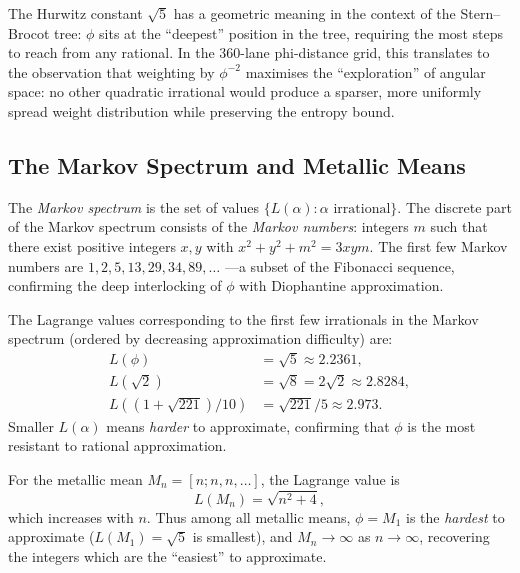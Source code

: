 \begin{remark}\label{rem:geom-interp}
The Hurwitz constant $\sqrt{5}$ has a geometric
meaning in the context of the Stern--Brocot tree:
$\phi$ sits at the ``deepest'' position in the
tree, requiring the most steps to reach from
any rational.  In the 360-lane phi-distance grid,
this translates to the observation that weighting
by $\phi^{-2}$ maximises the ``exploration'' of
angular space: no other quadratic irrational would
produce a sparser, more uniformly spread weight
distribution while preserving the entropy bound.
\end{remark}

\subsection{The Markov Spectrum and Metallic Means}
\label{subsec:markov-spectrum}

The \emph{Markov spectrum} is the set of values
$\{L(\alpha) : \alpha \text{ irrational}\}$.
The discrete part of the Markov spectrum consists
of the \emph{Markov numbers}: integers $m$ such
that there exist positive integers $x, y$ with
$x^2 + y^2 + m^2 = 3xym$.  The first few Markov
numbers are $1, 2, 5, 13, 29, 34, 89, \ldots$
---a subset of the Fibonacci sequence, confirming
the deep interlocking of $\phi$ with Diophantine
approximation.

The Lagrange values corresponding to the first
few irrationals in the Markov spectrum (ordered by
decreasing approximation difficulty) are:
\begin{align*}
  L(\phi) &= \sqrt{5} \approx 2.2361, \\
  L(\sqrt{2}) &= \sqrt{8} = 2\sqrt{2} \approx 2.8284, \\
  L((1+\sqrt{221})/10) &= \sqrt{221}/5 \approx 2.973.
\end{align*}
Smaller $L(\alpha)$ means \emph{harder} to
approximate, confirming that $\phi$ is the most
resistant to rational approximation.

For the metallic mean $M_n = [n;n,n,\ldots]$,
the Lagrange value is
\begin{equation}\label{eq:metallic-lagrange}
  L(M_n) = \sqrt{n^2 + 4},
\end{equation}
which increases with $n$.  Thus among all metallic
means, $\phi = M_1$ is the \emph{hardest} to
approximate ($L(M_1) = \sqrt{5}$ is smallest),
and $M_n \to \infty$ as $n \to \infty$, recovering
the integers which are the ``easiest'' to
approximate.

